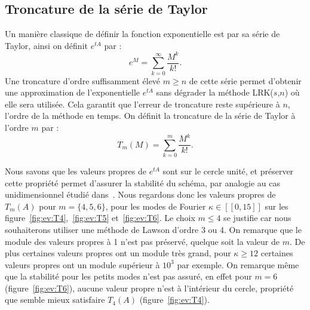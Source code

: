 \subsection{Troncature de la série de Taylor}

Un manière classique de définir la fonction exponentielle est par sa série de Taylor, ainsi on définit $e^{tA}$ par :
$$
  e^{M} = \sum_{k=0}^\infty \frac{M^k}{k!}.
$$
Une troncature d'ordre suffisamment élevé $m\geq n$ de cette série permet d'obtenir une approximation de l'exponentielle $e^{tA}$ sans dégrader la méthode LRK($s$,$n$) où elle sera utilisée. Cela garantit que l'erreur de troncature reste supérieure à $n$, l'ordre de la méthode en temps. On définit la troncature de la série de Taylor à l'ordre $m$ par :
$$
  T_m(M) = \sum_{k=0}^m \frac{M^k}{k!}.
$$

Nous savons que les valeurs propres de $e^{tA}$ sont sur le cercle unité, et préserver cette propriété permet d'assurer la stabilité du schéma, par analogie au cas unidimensionnel étudié dans~\cite{Crouseilles:2019b}. Nous regardons donc les valeurs propres de $T_m(A)$ pour $m=\{4,5,6\}$, pour les modes de Fourier $\kappa\in[\![0,15]\!]$ sur les figure~\ref{fig:ev:T4},~\ref{fig:ev:T5} et~\ref{fig:ev:T6}. Le choix $m\leq 4$ se justifie car nous souhaiterons utiliser une méthode de Lawson d'ordre 3 ou 4. On remarque que le module des valeurs propres à 1 n'est pas préservé, quelque soit la valeur de $m$. De plus certaines valeurs propres ont un module très grand, pour $\kappa\geq12$ certaines valeurs propres ont un module supérieur à $10^3$ par exemple. On remarque même que la stabilité pour les petits modes n'est pas assuré, en effet pour $m=6$ (figure~\ref{fig:ev:T6}), aucune valeur propre n'est à l'intérieur du cercle, propriété que semble mieux satisfaire $T_4(A)$ (figure~\ref{fig:ev:T4}).

